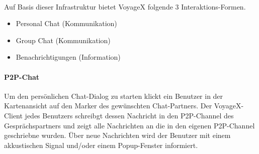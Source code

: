 \noindent\\ Auf Basis dieser Infrastruktur bietet VoyageX folgende 3 Interaktions-Formen.
\begin{itemize}
	\item Personal Chat (Kommunikation)
	\item Group Chat (Kommunikation)
	\item Benachrichtigungen (Information)
\end{itemize}



\paragraph{P2P-Chat}
Um den persönlichen Chat-Dialog zu starten klickt ein Benutzer in der Kartenansicht auf den Marker des gewünschten Chat-Partners. Der VoyageX-Client jedes Benutzers schreibgt dessen Nachricht in den P2P-Channel des Gesprächspartners und zeigt alle Nachrichten an die in den eigenen P2P-Channel geschriebne wurden. Über neue Nachrichten wird der Benutzer mit einem akkustischen Signal und/oder einem Popup-Fenster informiert.


